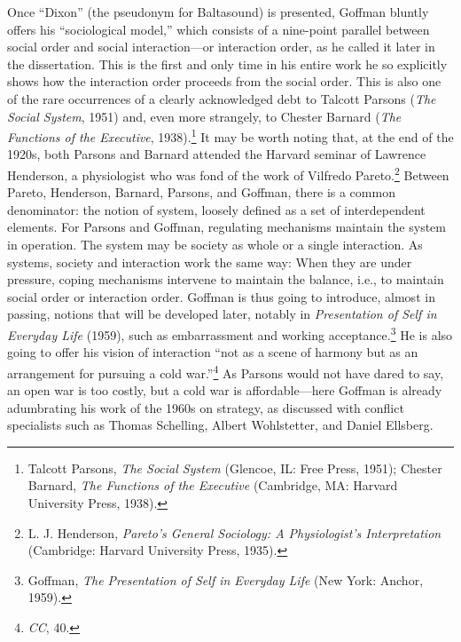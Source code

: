 \documentclass[openany,nobib]{tufte-book}
\begin{document}
Once ``Dixon'' (the pseudonym for Baltasound) is presented, Goffman
bluntly offers his ``sociological model,'' which consists of a
nine-point parallel between social order and social interaction---or
interaction order, as he called it later in the dissertation. This is
the first and only time in his entire work he so explicitly shows how
the interaction order proceeds from the social order. This is also one
of the rare occurrences of a clearly acknowledged debt to Talcott
Parsons (\emph{The Social System}, 1951) and, even more strangely, to
Chester Barnard (\emph{The Functions of the Executive},
1938).\footnote{Talcott Parsons, \emph{The Social System} (Glencoe, IL:
  Free Press, 1951); Chester Barnard, \emph{The Functions of the
  Executive} (Cambridge, MA: Harvard University Press, 1938).} It may be
worth noting that, at the end of the 1920s, both Parsons and Barnard
attended the Harvard seminar of Lawrence Henderson, a physiologist who
was fond of the work of Vilfredo Pareto.\footnote{L. J. Henderson,
  \emph{Pareto's General Sociology: A Physiologist's Interpretation}
  (Cambridge: Harvard University Press, 1935).} Between Pareto,
Henderson, Barnard, Parsons, and Goffman, there is a common denominator:
the notion of system, loosely defined as a set of interdependent
elements. For Parsons and Goffman, regulating mechanisms maintain the
system in operation. The system may be society as whole or a single
interaction. As systems, society and interaction work the same way: When
they are under pressure, coping mechanisms intervene to maintain the
balance, i.e., to maintain social order or interaction order. Goffman is
thus going to introduce, almost in passing, notions that will be
developed later, notably in \emph{Presentation of Self in Everyday Life}
(1959), such as embarrassment and working acceptance.\footnote{Goffman,
  \emph{The Presentation of Self in Everyday Life} (New York: Anchor,
  1959).} He is also going to offer his vision of interaction ``not as a
scene of harmony but as an arrangement for pursuing a cold
war.''\footnote{\emph{CC}, 40.} As Parsons would not have dared to say,
an open war is too costly, but a cold war is affordable---here Goffman
is already adumbrating his work of the 1960s on strategy, as discussed
with conflict specialists such as Thomas Schelling, Albert Wohlstetter,
and Daniel Ellsberg.
\end{document}

